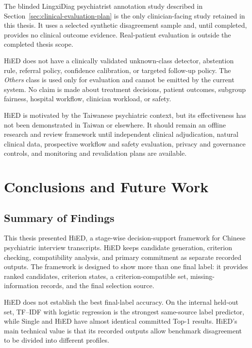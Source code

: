 The blinded LingxiDiag psychiatrist annotation study described in Section~\ref{sec:clinical-evaluation-plan} is the only clinician-facing study retained in this thesis. It uses a selected synthetic disagreement sample and, until completed, provides no clinical outcome evidence. Real-patient evaluation is outside the completed thesis scope.

HiED does not have a clinically validated unknown-class detector, abstention rule, referral policy, confidence calibration, or targeted follow-up policy. The \emph{Others} class is used only for evaluation and cannot be emitted by the current system. No claim is made about treatment decisions, patient outcomes, subgroup fairness, hospital workflow, clinician workload, or safety.

HiED is motivated by the Taiwanese psychiatric context, but its effectiveness has not been demonstrated in Taiwan or elsewhere. It should remain an offline research and review framework until independent clinical adjudication, natural clinical data, prospective workflow and safety evaluation, privacy and governance controls, and monitoring and revalidation plans are available.

\chapter{Conclusions and Future Work}
\label{ch:conclusion}

\section{Summary of Findings}

This thesis presented HiED, a stage-wise decision-support framework for Chinese psychiatric interview transcripts. HiED keeps candidate generation, criterion checking, compatibility analysis, and primary commitment as separate recorded outputs. The framework is designed to show more than one final label: it provides ranked candidates, criterion states, a criterion-compatible set, missing-information records, and the final selection source.

HiED does not establish the best final-label accuracy. On the internal held-out set, TF--IDF with logistic regression is the strongest same-source label predictor, while Single and HiED have almost identical committed Top-1 results. HiED's main technical value is that its recorded outputs allow benchmark disagreement to be divided into different profiles.

